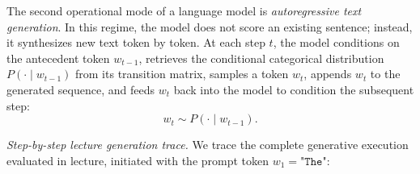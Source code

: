 \documentclass[../../../main.tex]{subfiles}
\begin{document}
The second operational mode of a language model is \textit{autoregressive text generation}. In this regime, the model does not score an existing sentence; instead, it synthesizes new text token by token. At each step $t$, the model conditions on the antecedent token $w_{t-1}$, retrieves the conditional categorical distribution $P(\cdot \mid w_{t-1})$ from its transition matrix, samples a token $w_t$, appends $w_t$ to the generated sequence, and feeds $w_t$ back into the model to condition the subsequent step:
\begin{equation}
w_t \sim P\left(\cdot \mid w_{t-1}\right).
\end{equation}

\textit{Step-by-step lecture generation trace.} We trace the complete generative execution evaluated in lecture, initiated with the prompt token $w_1 = \texttt{"The"}$:
\end{document}
